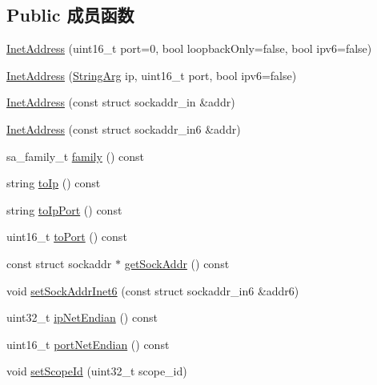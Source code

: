 \subsection*{Public 成员函数}
\begin{DoxyCompactItemize}
\item 
\hyperlink{classmuduo_1_1net_1_1InetAddress_a0665e9d84a1b2d745f9a029d383bb39b}{Inet\+Address} (uint16\+\_\+t port=0, bool loopback\+Only=false, bool ipv6=false)
\item 
\hyperlink{classmuduo_1_1net_1_1InetAddress_a948f78f97106b3f44d2d1a2f5d5cae2e}{Inet\+Address} (\hyperlink{classmuduo_1_1StringArg}{String\+Arg} ip, uint16\+\_\+t port, bool ipv6=false)
\item 
\hyperlink{classmuduo_1_1net_1_1InetAddress_a8d41e312d44ecfdf968e66a26fea15ab}{Inet\+Address} (const struct sockaddr\+\_\+in \&addr)
\item 
\hyperlink{classmuduo_1_1net_1_1InetAddress_a718c0a2238c40742e85f42befd0a8f48}{Inet\+Address} (const struct sockaddr\+\_\+in6 \&addr)
\item 
sa\+\_\+family\+\_\+t \hyperlink{classmuduo_1_1net_1_1InetAddress_ab891669cb0d4a26cacfe05d880faa522}{family} () const
\item 
string \hyperlink{classmuduo_1_1net_1_1InetAddress_a0ee7fcbc0dcb2dd6e661bca5c474aa87}{to\+Ip} () const
\item 
string \hyperlink{classmuduo_1_1net_1_1InetAddress_ad2d721eadb1b653b234c2ab15c5ed44f}{to\+Ip\+Port} () const
\item 
uint16\+\_\+t \hyperlink{classmuduo_1_1net_1_1InetAddress_a380ad66a2d3243cfa58f23c494a6f64f}{to\+Port} () const
\item 
const struct sockaddr $\ast$ \hyperlink{classmuduo_1_1net_1_1InetAddress_ab5cafd18573e44504d4134b12b2fd796}{get\+Sock\+Addr} () const
\item 
void \hyperlink{classmuduo_1_1net_1_1InetAddress_aba3e8d31ba37537c3cc7dc8e8df86564}{set\+Sock\+Addr\+Inet6} (const struct sockaddr\+\_\+in6 \&addr6)
\item 
uint32\+\_\+t \hyperlink{classmuduo_1_1net_1_1InetAddress_a0f3b1573a23312af5b1f3edd83cc394f}{ip\+Net\+Endian} () const
\item 
uint16\+\_\+t \hyperlink{classmuduo_1_1net_1_1InetAddress_aa95202a1992cdd3177c9f76b4f9fc63e}{port\+Net\+Endian} () const
\item 
void \hyperlink{classmuduo_1_1net_1_1InetAddress_a0957796a48a04ac2c1ff03c197d97c38}{set\+Scope\+Id} (uint32\+\_\+t scope\+\_\+id)
\end{DoxyCompactItemize}
